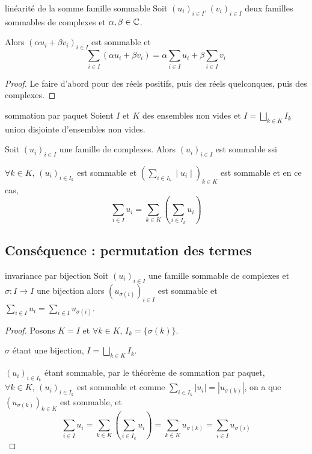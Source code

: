 \begin{proposition}{linéarité de la somme famille sommable}{}
    Soit $(u_i)_{i \in I}, (v_i)_{i \in I}$ deux familles sommables de complexes et $\alpha, \beta \in \mathbb{C}$.

    Alors $(\alpha u_i + \beta v_i)_{i \in I}$ est sommable et
    $$\sum_{i \in I} (\alpha u_i + \beta v_i) = \alpha \sum_{i \in I} u_i + \beta \sum_{i \in I} v_i$$
\end{proposition}

\begin{proof}
    Le faire d'abord pour des réels positifs, puis des réels quelconques, puis des complexes.
\end{proof}

\begin{theoreme}{sommation par paquet}{}
    Soient $I$ et $K$ des ensembles non vides et $\displaystyle I = \bigsqcup_{k \in K} I_k$ union
    disjointe d'ensembles non vides.

    Soit $(u_i)_{i \in I}$ une famille de complexes. Alors $(u_i)_{i \in I}$ est sommable ssi
    
    $\forall k \in K, \, (u_i)_{i \in I_k}$ est sommable et $\displaystyle \left( \sum_{i \in I_k} \mid u_i \mid \right)_{k \in K}$ est sommable
    et en ce cas, 
    $$ \sum_{i \in I} u_i = \sum_{k \in K} \left( \sum_{i \in I_k} u_i \right)$$
\end{theoreme}

\subsection{Conséquence : permutation des termes}

\begin{theoreme}{invariance par bijection}{}
    Soit $(u_i)_{i \in I}$ une famille sommable de complexes et $\sigma: I \to I$ une bijection 
    alors $(u_{\sigma(i)})_{i \in I}$ est sommable et $\displaystyle \sum_{i \in I} u_i = \sum_{i \in I} u_{\sigma(i)}$.
\end{theoreme}

\begin{proof}
    Posons $K = I$ et $\forall k \in K, \, I_k = \{\sigma(k)\}$.

    $\sigma$ étant une bijection, $\displaystyle I = \bigsqcup_{k \in K} I_k$.

    $(u_i)_{i \in I_k}$ étant sommable, par le théorème de sommation par paquet, 
    $\forall k \in K, \, (u_i)_{i \in I_k}$ est sommable 
    et comme $\displaystyle \sum_{i \in I_k} |u_i| = |u_{\sigma(k)}|$,
    on a que $(u_{\sigma(k)})_{k \in K}$ est sommable, et 
    $$\sum_{i \in I} u_i = \sum_{k \in K} \left( \sum_{i \in I_k} u_i \right) = \sum_{k \in K} u_{\sigma(k)} = \sum_{i \in I} u_{\sigma(i)}$$
\end{proof}

